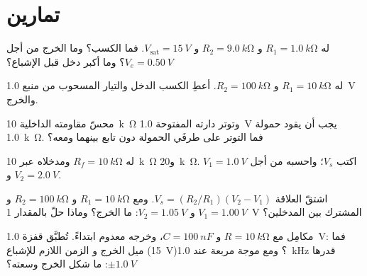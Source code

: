 \section{تمارين}

\begin{exercise}[$\star$]\label{exo:b1:operational-amplifier:1}
 له $R_1 = \qty{1.0}{k\ohm}$ و $R_2 =
\qty{9.0}{k\ohm}$ و $V_{\mathrm{sat}} = \qty{15}{V}$. فما الكسب؟ وما الخرج من أجل
$V_e = \qty{0.50}{V}$؟ وما أكبر دخل قبل الإشباع؟
\end{exercise}

\begin{exercise}[$\star$]\label{exo:b1:operational-amplifier:2}
 له $R_1 = \qty{10}{k\ohm}$ و $R_2 = \qty{100}{k\ohm}$.
أعطِ الكسب  الدخل والتيار المسحوب من منبع \qty{1.0}{V} والخرج.
\end{exercise}

\begin{exercise}[$\star$]\label{exo:b1:operational-amplifier:3}
محسّ مقاومته الداخلية \qty{10}{k\ohm} وتوتر دارته المفتوحة
\qty{1.0}{V} يجب أن يقود حمولة \qty{1.0}{k\ohm}. فما التوتر على طرفَي
الحمولة دون تابع بينهما ومعه؟
\end{exercise}

\begin{exercise}[$\star$]\label{exo:b1:operational-amplifier:4}
 له $R_f = \qty{10}{k\ohm}$ ومدخلاه عبر
\qty{10}{k\ohm} و\qty{20}{k\ohm}. اكتب $V_s$؛ واحسبه من أجل
$V_1 = \qty{1.0}{V}$ و $V_2 = \qty{2.0}{V}$.
\end{exercise}

\begin{exercise}[$\star\star$]\label{exo:b1:operational-amplifier:5}
اشتقّ  العلاقة $V_s = (R_2/R_1)(V_2 - V_1)$. ومع
$R_1 = \qty{10}{k\ohm}$ و $R_2 = \qty{100}{k\ohm}$ و $V_1 = \qty{1.00}{V}$ و
$V_2 = \qty{1.05}{V}$: ما الخرج؟ وماذا حلّ بالمقدار \qty{1}{V} المشترك
بين المدخلين؟
\end{exercise}

\begin{exercise}[$\star\star$]\label{exo:b1:operational-amplifier:6}
مكامِل مع $R = \qty{10}{k\ohm}$ و $C = \qty{100}{nF}$، وخرجه
معدوم ابتداءً. تُطبَّق قفزة \qty{1.0}{V}: فما ميل الخرج و
الزمن اللازم للإشباع (\qty{15}{V})؟ ومع موجة مربعة عند \qty{1.0}{kHz} قدرها
$\pm\qty{1.0}{V}$: ما شكل الخرج وسعته؟
\end{exercise}

